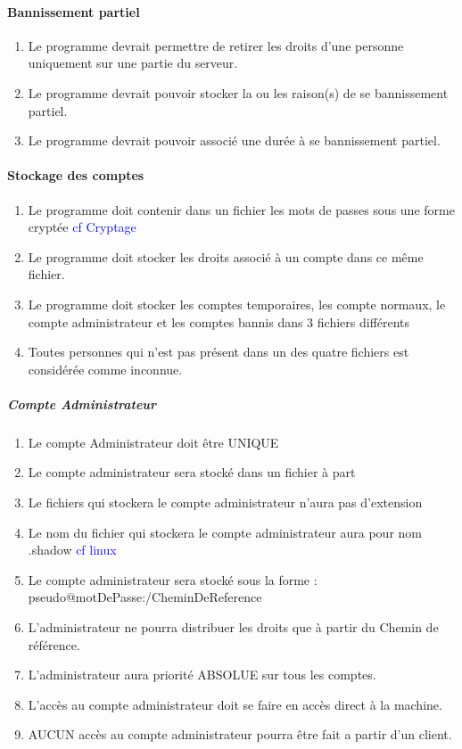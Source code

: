 \documentclass[10pt,a4paper]{report}
\begin{document}
\paragraph{Bannissement partiel}
	\begin{enumerate}
		\item Le programme devrait permettre de retirer les droits d'une personne uniquement sur une partie du serveur.
		\item Le programme devrait pouvoir stocker la ou les raison(s) de se bannissement partiel.
		\item Le programme devrait pouvoir associé une durée à se bannissement partiel.
	\end{enumerate}
	
\paragraph{Stockage des comptes}
	\begin{enumerate}
		\item Le programme doit contenir dans un fichier les mots de passes sous une forme cryptée \textcolor{blue}{cf Cryptage}
		\item Le programme doit stocker les droits associé à un compte dans ce même fichier.
		\item Le programme doit stocker les comptes temporaires, les compte normaux, le compte administrateur et les comptes bannis dans 3 fichiers différents
		\item Toutes personnes qui n'est pas présent dans un des quatre fichiers est considérée comme inconnue.
	\end{enumerate}
		
	\subparagraph{Compte Administrateur}
		\begin{enumerate}
			\item Le compte Administrateur doit être UNIQUE
			\item Le compte administrateur sera stocké dans un fichier à part
			\item Le fichiers qui stockera le compte administrateur n'aura pas d'extension
			\item Le nom du fichier qui stockera le compte administrateur aura pour nom .shadow \textcolor{blue}{cf linux}
			\item Le compte administrateur sera stocké sous la forme : pseudo@motDePasse:/CheminDeReference
			\item L'administrateur ne pourra distribuer les droits que à partir du Chemin de référence.
			\item L'administrateur aura priorité ABSOLUE sur tous les comptes.
			\item L'accès au compte administrateur doit se faire en accès direct à la machine. 
			\item AUCUN accès au compte administrateur pourra être fait a partir d'un client.
		\end{enumerate}
		
\end{document}
